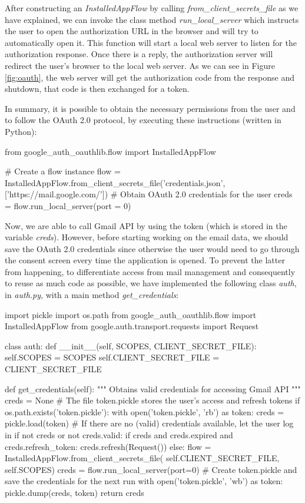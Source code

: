 After constructing an \textit{InstalledAppFlow} by calling \textit{from\_client\_secrets\_file} as we have explained, we can invoke the class method \textit{run\_local\_server} which instructs the user to open the authorization URL in the browser and will try to automatically open it. This function will start a local web server to listen for the authorization response. Once there is a reply, the authorization server will redirect the user's browser to the local web server. As we can see in Figure \ref{fig:oauth}, the web server will get the authorization code from the response and shutdown, that code is then exchanged for a token.

In summary, it is possible to obtain the necessary permissions from the user and to follow the OAuth 2.0 protocol, by executing these instructions (written in Python):

\begin{python}
	from google_auth_oauthlib.flow import InstalledAppFlow
	
	# Create a flow instance
	flow = InstalledAppFlow.from_client_secrets_file('credentials.json', 
	['https://mail.google.com/'])
	# Obtain OAuth 2.0 credentials for the user
	creds = flow.run_local_server(port = 0)
\end{python}

Now, we are able to call Gmail API by using the token (which is stored in the variable \textit{creds}). However, before starting working on the email data, we should save the OAuth 2.0 credentials since otherwise the user would need to go through the consent screen every time the application is opened. To prevent the latter from happening, to differentiate access from mail management and consequently to reuse as much code as possible, we have implemented the following class \textit{auth}, in \textit{auth.py}, with a main method \textit{get\_credentials}:

\begin{pythonnum}
	import pickle
	import os.path
	from google_auth_oauthlib.flow import InstalledAppFlow
	from google.auth.transport.requests import Request
	
	class auth:
	def __init__(self, SCOPES, CLIENT_SECRET_FILE):
	self.SCOPES = SCOPES
	self.CLIENT_SECRET_FILE = CLIENT_SECRET_FILE
	
	def get_credentials(self):
	"""
	Obtains valid credentials for accessing Gmail API
	"""
	creds = None
	# The file token.pickle stores the user's access and refresh tokens
	if os.path.exists('token.pickle'):
	with open('token.pickle', 'rb') as token:
	creds = pickle.load(token)
	# If there are no (valid) credentials available, let the user log in
	if not creds or not creds.valid:
	if creds and creds.expired and creds.refresh_token:
	creds.refresh(Request())
	else:
	flow = InstalledAppFlow.from_client_secrets_file(
	self.CLIENT_SECRET_FILE, self.SCOPES)
	creds = flow.run_local_server(port=0)
	# Create token.pickle and save the credentials for the next run
	with open('token.pickle', 'wb') as token:
	pickle.dump(creds, token)
	return creds
	
\end{pythonnum}

